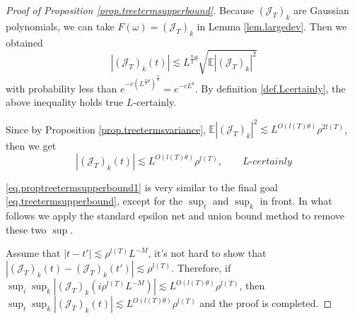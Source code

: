 \begin{proof}[Proof of Proposition \ref{prop.treetermsupperbound}] Because $(\mathcal{J}_{T})_{k}$ are Gaussian polynomials, we can take $F(\omega)=(\mathcal{J}_{T})_{k}$ in Lemma \ref{lem.largedev}. Then we obtained
\begin{equation}
|(\mathcal{J}_{T})_{k}(t)|\lesssim L^{\frac{n}{2}\theta} \sqrt{\mathbb{E}|(\mathcal{J}_T)_k|^2}
\end{equation} 
with probability less than $e^{-c(L^{\frac{n}{2}\theta})^{\frac{2}{n}}}=e^{-cL^{\theta}}$. By definition \ref{def.Lcertainly}, the above inequality holds true $L$-certainly.

Since by Proposition \ref{prop.treetermsvariance}, $\mathbb{E}|(\mathcal{J}_T)_k|^2\lesssim L^{O(l(T)\theta)} \rho^{2l(T)}$, then we get 
\begin{equation}\label{eq.proptreetermsupperbound1}
|(\mathcal{J}_{T})_{k}(t)|\lesssim L^{O(l(T)\theta)} \rho^{l(T)},\qquad \textit{L-certainly}
\end{equation} 

\eqref{eq.proptreetermsupperbound1} is very similar to the final goal \eqref{eq.treetermsupperbound}, except for the $\sup_t$ and $\sup_k$ in front. In what follows we apply the standard epsilon net and union bound method to remove these two $\sup$.

Assume that $|t-t'|\lesssim \rho^{l(T)}L^{-M}$, it's not hard to show that $|(\mathcal{J}_{T})_{k}(t)-(\mathcal{J}_{T})_{k}(t')|\lesssim \rho^{l(T)}$. Therefore, if $\sup_{i} \sup_{k} |(\mathcal{J}_{T})_{k}(i\rho^{l(T)}L^{-M})|\lesssim L^{O(l(T)\theta)} \rho^{l(T)}$, then $\sup_{t} \sup_{k} |(\mathcal{J}_{T})_{k}(t)|\lesssim L^{O(l(T)\theta)} \rho^{l(T)}$ and the proof is completed.


\end{proof}
